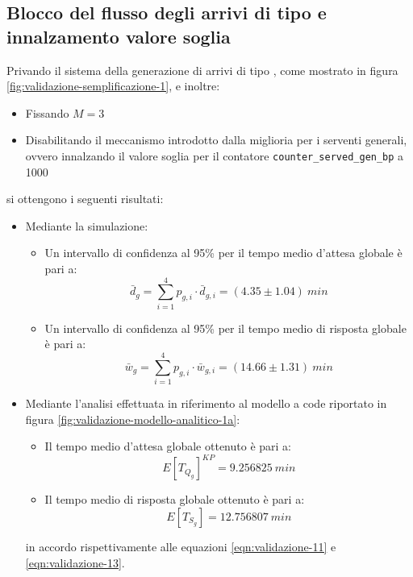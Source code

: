 \subsection{Blocco del flusso degli arrivi di tipo \sr{} e innalzamento valore soglia}
Privando il sistema della generazione di arrivi di tipo \sr{}, come mostrato in figura \ref{fig:validazione-semplificazione-1}, e inoltre:
\begin{itemize}
\item Fissando $M = 3$
\item Disabilitando il meccanismo introdotto dalla miglioria per i serventi generali, ovvero innalzando il valore soglia per il contatore \texttt{counter\_served\_gen\_bp} a 1000
\end{itemize}
si ottengono i seguenti risultati:
\begin{itemize}
\item Mediante la simulazione:
\begin{itemize}
\item Un intervallo di confidenza al 95\% per il tempo medio d'attesa globale è pari a:
\begin{equation} 
\bar{d}_g = \sum_{i = 1}^4 p_{g,i}\cdot \bar{d}_{g,i} = (4.35 \pm 1.04)\ min
\end{equation}
\item Un intervallo di confidenza al 95\% per il tempo medio di risposta globale è pari a:
\begin{equation}
\bar{w}_g = \sum_{i = 1}^4 p_{g,i}\cdot \bar{w}_{g,i} = (14.66 \pm 1.31)\ min
\end{equation}
\end{itemize}

\item Mediante l'analisi effettuata in riferimento al modello a code riportato in figura \ref{fig:validazione-modello-analitico-1a}:
\begin{itemize}
\item Il tempo medio d'attesa globale ottenuto è pari a:
\begin{equation}
E[T_{Q_g}]^{KP} = 9.256825\ min 
\end{equation}
\item Il tempo medio di risposta globale ottenuto è pari a:
\begin{equation}
E[T_{S_g}] = 12.756807\ min 
\end{equation}
\end{itemize}
in accordo rispettivamente alle equazioni \ref{eqn:validazione-11} e \ref{eqn:validazione-13}.
\end{itemize}

